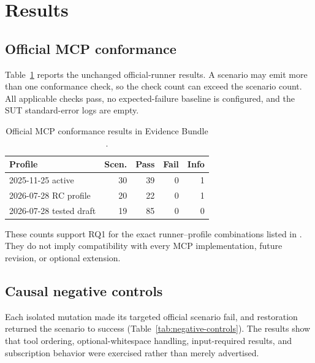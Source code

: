 \section{Results}
\label{sec:results}

\subsection{Official MCP conformance}
Table~\ref{tab:mcp-results} reports the unchanged official-runner results. A scenario may emit more than one conformance check, so the check count can exceed the scenario count. All applicable checks pass, no expected-failure baseline is configured, and the SUT standard-error logs are empty.

\begin{table}[t]
\caption{Official MCP conformance results in Evidence Bundle \evidenceid.}
\label{tab:mcp-results}
\centering
\begin{tabular}{lrrrr}
\toprule
Profile & Scen. & Pass & Fail & Info \\
\midrule
2025-11-25 active & 30 & 39 & 0 & 1 \\
2026-07-28 RC profile & 20 & 22 & 0 & 1 \\
2026-07-28 tested draft & 19 & 85 & 0 & 0 \\
\bottomrule
\end{tabular}
\end{table}

These counts support RQ1 for the exact runner--profile combinations listed in . They do not imply compatibility with every MCP implementation, future revision, or optional extension.

\subsection{Causal negative controls}
Each isolated mutation made its targeted official scenario fail, and restoration returned the scenario to success (Table~\ref{tab:negative-controls}). The results show that tool ordering, optional-whitespace handling, input-required results, and subscription behavior were exercised rather than merely advertised.

